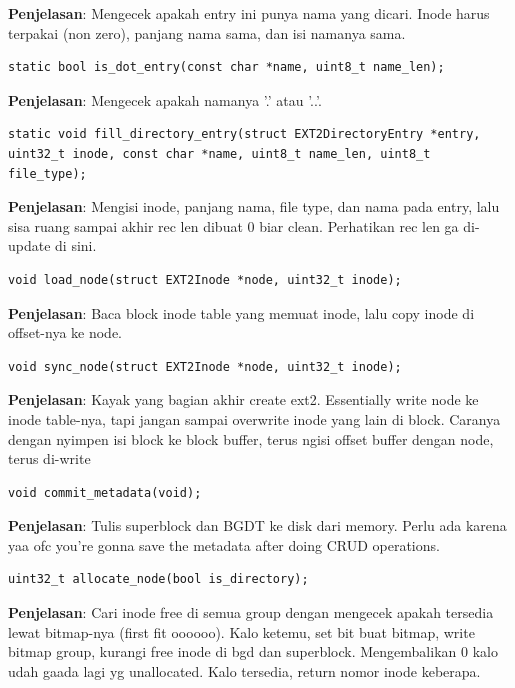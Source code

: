 \textbf{Penjelasan}: Mengecek apakah entry ini punya nama yang dicari. Inode harus terpakai (non zero), panjang nama sama, dan isi namanya sama.

\begin{lstlisting}
static bool is_dot_entry(const char *name, uint8_t name_len);
\end{lstlisting}

\textbf{Penjelasan}: Mengecek apakah namanya '.' atau '..'.

\begin{lstlisting}
static void fill_directory_entry(struct EXT2DirectoryEntry *entry, uint32_t inode, const char *name, uint8_t name_len, uint8_t file_type);
\end{lstlisting}

\textbf{Penjelasan}: Mengisi inode, panjang nama, file type, dan nama pada entry, lalu sisa ruang sampai akhir rec len dibuat 0 biar clean. Perhatikan rec len ga di-update di sini.

\begin{lstlisting}
void load_node(struct EXT2Inode *node, uint32_t inode);
\end{lstlisting}

\textbf{Penjelasan}: Baca block inode table yang memuat inode, lalu copy inode di offset-nya ke node.

\begin{lstlisting}
void sync_node(struct EXT2Inode *node, uint32_t inode);
\end{lstlisting}

\textbf{Penjelasan}: Kayak yang bagian akhir create ext2. Essentially write node ke inode table-nya, tapi jangan sampai overwrite inode yang lain di block. Caranya dengan nyimpen isi block ke block buffer, terus ngisi offset buffer dengan node, terus di-write

\begin{lstlisting}
void commit_metadata(void);
\end{lstlisting}

\textbf{Penjelasan}: Tulis superblock dan BGDT ke disk dari memory. Perlu ada karena yaa ofc you're gonna save the metadata after doing CRUD operations.

\begin{lstlisting}
uint32_t allocate_node(bool is_directory);
\end{lstlisting}

\textbf{Penjelasan}: Cari inode free di semua group dengan mengecek apakah tersedia lewat bitmap-nya (first fit oooooo). Kalo ketemu, set bit buat bitmap, write bitmap group, kurangi free inode di bgd dan superblock. Mengembalikan 0 kalo udah gaada lagi yg unallocated. Kalo tersedia, return nomor inode keberapa.


